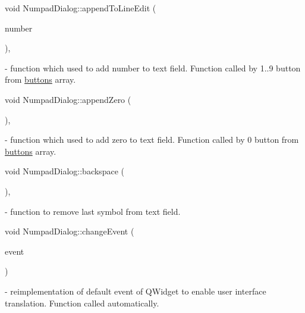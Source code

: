 \mbox{\label{classNumpadDialog_a717c92c0ce30150bcb0d8bb963ba4b9a}} 
{\footnotesize\ttfamily void Numpad\+Dialog\+::\texorpdfstring{append\+To\+Line\+Edit}{appendToLineEdit} (\begin{DoxyParamCaption}\item[{int}]{number }\end{DoxyParamCaption})\hspace{0.3cm}{\ttfamily [private]}, {\ttfamily [slot]}} - function which used to add number to text field. Function called by 1..9 button from \hyperlink{classNumpadDialog_a3b2f37aea17608ca6040eb8efa6c4cf9}{buttons} array.

\mbox{\label{classNumpadDialog_a195579dcc41869beef3b584451614013}} 
{\footnotesize\ttfamily void Numpad\+Dialog\+::\texorpdfstring{append\+Zero}{appendZero} (\begin{DoxyParamCaption}{ }\end{DoxyParamCaption})\hspace{0.3cm}{\ttfamily [private]}, {\ttfamily [slot]}} - function which used to add zero to text field. Function called by 0 button from \hyperlink{classNumpadDialog_a3b2f37aea17608ca6040eb8efa6c4cf9}{buttons} array.

\mbox{\label{classNumpadDialog_ac0f1db7275e66501c52a5c1b9348ebd6}} 
{\footnotesize\ttfamily void Numpad\+Dialog\+::\texorpdfstring{backspace}{backspace} (\begin{DoxyParamCaption}{ }\end{DoxyParamCaption})\hspace{0.3cm}{\ttfamily [private]}, {\ttfamily [slot]}} - function to remove last symbol from text field.

\mbox{\label{classNumpadDialog_a73f71a3f983e17628468bf843643542e}} 
{\footnotesize\ttfamily void Numpad\+Dialog\+::\texorpdfstring{change\+Event}{changeEvent} (\begin{DoxyParamCaption}\item[{Q\+Event $\ast$}]{event }\end{DoxyParamCaption})\hspace{0.3cm}{\ttfamily [protected]}} - reimplementation of default event of Q\+Widget to enable user interface translation. Function called automatically.

